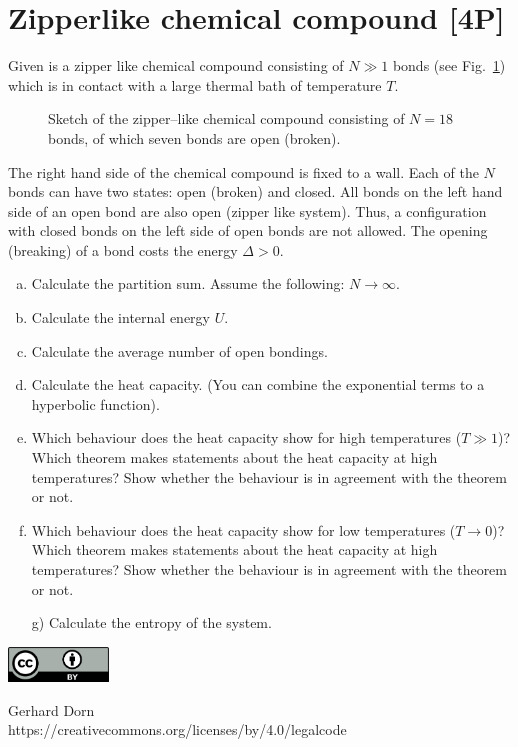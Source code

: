 \documentclass[12pt,a4paper]{article} %
\begin{document}
\section{Zipperlike chemical compound [4P]}
Given is a zipper like chemical compound consisting of $N \gg 1$ bonds (see Fig.~\ref{fig:zipper}) which is in contact with a large thermal bath of temperature $T$.
\begin{figure}[h]
\begin{center}
 \caption{Sketch of the zipper--like chemical compound consisting of $N = 18$ bonds, of which seven bonds are open (broken).} \label{fig:zipper}
 \end{center}
\end{figure}
The right hand side of the chemical compound is fixed to a wall. Each of the $N$ bonds can have two states: open (broken) and closed. All bonds on the left hand side of an open bond are also open (zipper like system). Thus, a configuration with closed bonds on the left side of open bonds are not allowed.
The opening (breaking) of a bond costs the energy $\Delta > 0$.

\begin{enumerate}[a)]
 \item Calculate the partition sum. Assume the following: $N\rightarrow \infty$.
 \item Calculate the internal energy $U$. 
 \item Calculate the average number of open bondings.
 \item Calculate the heat capacity. (You can combine the exponential terms to a hyperbolic function).
 \item Which behaviour does the heat capacity show for high temperatures ($T \gg 1$)?\\
Which theorem makes statements about the heat capacity at high temperatures? Show whether the behaviour is in agreement with the theorem or not.
 \item Which behaviour does the heat capacity show for low temperatures ($T \rightarrow 0$)?\\
Which theorem makes statements about the heat capacity at high temperatures? Show whether the behaviour is in agreement with the theorem or not.
 \item[g)] Calculate the entropy of the system.
\end{enumerate}





\vspace{2cm}
\begin{minipage}[t]{1\textwidth}
	\raggedleft
	\centering
	\includegraphics[width = 0.20\textwidth]{CC-BY_icon}
	\vspace{0.2cm}
	
	\centering
	{\Large Gerhard Dorn} \\
	https://creativecommons.org/licenses/by/4.0/legalcode
\end{minipage}
\end{document}

